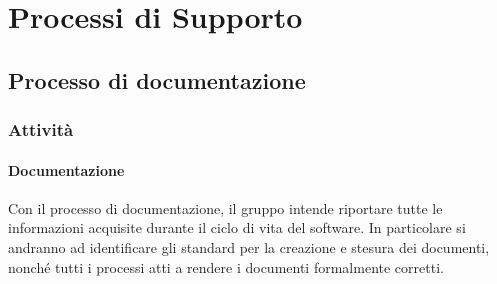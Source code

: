 

\section{Processi di Supporto}

	\subsection{Processo di documentazione}

		\subsubsection{Attività}

			\paragraph{Documentazione}
			Con il processo di documentazione, il gruppo \groupName{} intende riportare tutte le informazioni acquisite durante il ciclo di vita del software.
			In particolare si andranno ad identificare gli standard per la creazione e stesura dei documenti, nonché tutti i processi atti a rendere i documenti formalmente corretti.


